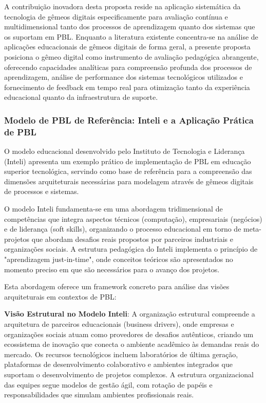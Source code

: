 \documentclass[12pt, a4paper, oneside, brazilian]{abntex2}
\begin{document}
A contribuição inovadora desta proposta reside na aplicação sistemática da tecnologia de gêmeos digitais especificamente para avaliação contínua e multidimensional tanto dos processos de aprendizagem quanto dos sistemas que os suportam em PBL. Enquanto a literatura existente \cite{bachmann2023} concentra-se na análise de aplicações educacionais de gêmeos digitais de forma geral, a presente proposta posiciona o gêmeo digital como instrumento de avaliação pedagógica abrangente, oferecendo capacidades analíticas para compreensão profunda dos processos de aprendizagem, análise de performance dos sistemas tecnológicos utilizados e fornecimento de feedback em tempo real para otimização tanto da experiência educacional quanto da infraestrutura de suporte.

\subsubsection{Modelo de PBL de Referência: Inteli e a Aplicação Prática de PBL}

O modelo educacional desenvolvido pelo Instituto de Tecnologia e Liderança (Inteli) \cite{inteli2024} apresenta um exemplo prático de implementação de PBL em educação superior tecnológica, servindo como base de referência para a compreensão das dimensões arquiteturais necessárias para modelagem através de gêmeos digitais de processos e sistemas.

O modelo Inteli fundamenta-se em uma abordagem tridimensional de competências que integra aspectos técnicos (computação), empresariais (negócios) e de liderança (soft skills), organizando o processo educacional em torno de meta-projetos que abordam desafios reais propostos por parceiros industriais e organizações sociais. A estrutura pedagógica do Inteli implementa o princípio de "aprendizagem just-in-time", onde conceitos teóricos são apresentados no momento preciso em que são necessários para o avanço dos projetos.

Esta abordagem oferece um framework concreto para análise das visões arquiteturais em contextos de PBL:

\textbf{Visão Estrutural no Modelo Inteli}: A organização estrutural compreende a arquitetura de parceiros educacionais (business drivers), onde empresas e organizações sociais atuam como provedores de desafios autênticos, criando um ecossistema de inovação que conecta o ambiente acadêmico às demandas reais do mercado. Os recursos tecnológicos incluem laboratórios de última geração, plataformas de desenvolvimento colaborativo e ambientes integrados que suportam o desenvolvimento de projetos complexos. A estrutura organizacional das equipes segue modelos de gestão ágil, com rotação de papéis e responsabilidades que simulam ambientes profissionais reais.
\end{document}
